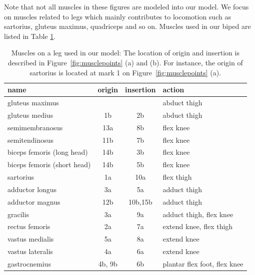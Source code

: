 \documentclass[master,english,final]{kaist-ucs}
\begin{document}
Note that not all muscles in these figures are modeled into our model.
We focus on muscles related to legs which mainly contributes to locomotion
such as sartorius, gluteus maximus, quadriceps and so on.
Muscles used in our biped are listed in Table \ref{musclelist}.

\begin{table}[h!]
\centering
  \begin{tabular}{lccl}
  name                            &  origin       &insertion& action \\
  \hline
  gluteus maximus                 &               &         & abduct thigh\\
  gluteus medius                  &  1b           & 2b      & abduct thigh\\
  semimembranosus                 &  13a          & 8b      & flex knee \\
  semitendinosus                  &  11b          & 7b      & flex knee \\
  biceps femoris (long head)      &  14b          & 3b      & flex knee \\
  biceps femoris (short head)     &  14b          & 5b      & flex knee \\
  sartorius                       &  1a           & 10a     & flex thigh \\
  adductor longus                 &  3a           & 5a      & adduct thigh \\
  adductor magnus                 &  12b          & 10b,15b & adduct thigh \\
  gracilis                        &  3a           & 9a      & adduct thigh, flex knee \\
  rectus femoris                  &  2a           & 7a      & extend knee, flex thigh \\
  vastus medialis                 &  5a           & 8a      & extend knee \\
  vastus lateralis                &  4a           & 6a      & extend knee\\
  gastrocnemius                   &  4b, 9b       & 6b      & plantar flex foot, flex knee\\
  \hline
\end{tabular}
\caption[Muscles on a leg used in our model]
{Muscles on a leg used in our model: The location of origin and insertion
is described in Figure~\ref{fig:musclepoints} (a) and (b). For instance, the origin of
sartorius is located at mark 1 on Figure~\ref{fig:musclepoints} (a).}
\label{musclelist}
\end{table}
\end{document}

